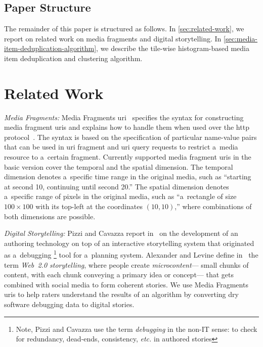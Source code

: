 \documentclass{article}
\begin{document}
\subsection{Paper Structure}
\label{sec:paper-structure}

The remainder of this paper is structured as follows.
In \autoref{sec:related-work}, we report on related work
on media fragments and digital storytelling.
In \autoref{sec:media-item-deduplication-algorithm},
we describe the tile-wise histogram-based
media item deduplication and clustering algorithm.


\section{Related Work}
\label{sec:related-work}

\noindent \textit{Media Fragments:}
Media Fragments {\sc uri}~\cite{troncy2012mediafragments} specifies
the syntax for constructing media fragment {\sc uri}s
and explains how to handle them
when used over the {\sc http} protocol~\cite{fielding1999http}.
The syntax is based on the specification of particular name-value pairs
that can be used in {\sc uri} fragment and {\sc uri} query requests
to restrict a~media resource to a~certain fragment.
Currently supported media fragment {\sc uri}s in the basic version
cover the temporal and the spatial dimension.
The temporal dimension denotes a~specific time range in the original media,
such as ``starting at second 10, continuing until second 20.''
The spatial dimension denotes a~specific range of pixels in the original media,
such as ``a~rectangle of size $ 100 \times 100 $
with its top-left at the coordinates $ (10, 10) $,''
where combinations of both dimensions are possible.

\noindent \textit{Digital Storytelling:}
Pizzi and Cavazza report in~\cite{pizzi2008debugging} on the development of
an authoring technology on top of an interactive storytelling system
that originated as a~debugging%
\footnote{Note, Pizzi and Cavazza use the term \emph{debugging} in the non-IT sense:
to check for redundancy, dead-ends, consistency, \emph{etc.} in authored stories}
tool for a~planning system.
Alexander and Levine define in~\cite{alexander2008storytelling}
the term \emph{Web~2.0 storytelling}, where people create \emph{microcontent}---%
small chunks of content, with each chunk conveying a primary idea or concept---%
that gets combined with social media to form coherent stories.
We use Media Fragments {\sc uri}s to help raters understand
the results of an algorithm by converting dry software debugging data
to digital stories.
\end{document}
